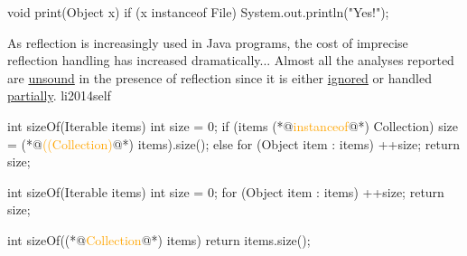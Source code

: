 \documentclass{article}
\begin{document}

\pptToc


\begin{lnSnippet}
void print(Object x) {
  if (x instanceof File) {
    System.out.println("Yes!");
  }
}
\end{lnSnippet}

  {As reflection is increasingly used in Java programs, the cost of imprecise reflection handling has increased dramatically... Almost all the analyses reported are \ul{unsound} in the presence of reflection since it is either \ul{ignored} or handled \ul{partially}.}
  {li2014self}


\begin{lnSnippet}
int sizeOf(Iterable items) {
  int size = 0;
  if (items (*@\textcolor{orange}{instanceof}@*) Collection) {
    size = (*@\textcolor{orange}{((Collection)}@*) items).size();
  } else {
    for (Object item : items) {
      ++size;
    }
  }
  return size;
}
\end{lnSnippet}
\begin{lnSnippet}
int sizeOf(Iterable items) {
  int size = 0;
  for (Object item : items) {
    ++size;
  }
  return size;
}

int sizeOf((*@\textcolor{orange}{Collection}@*) items) {
  return items.size();
}
\end{lnSnippet}
\end{document}
